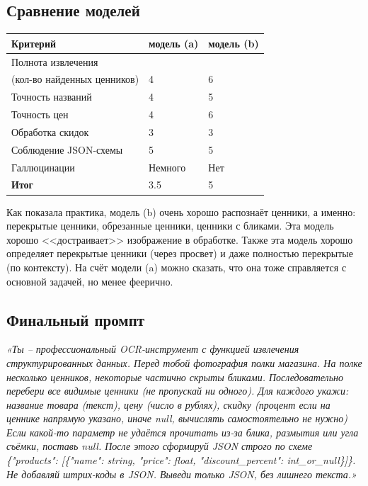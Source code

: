 \subsection{Сравнение моделей}
\begin{table}[h!]
	\centering
	\begin{tabular}{|l|p{5cm}|p{5cm}|}
		\hline
		\textbf{Критерий} & \textbf{модель (a)} & \textbf{модель (b)} \\
		\hline
		Полнота извлечения \\(кол-во найденных ценников) & 4 & 6 \\
		\hline
		Точность названий & 4 & 5 \\
		\hline
		Точность цен & 4 & 6 \\
		\hline
		Обработка скидок  & 3 & 3 \\
		\hline
		Соблюдение JSON-схемы & 5 & 5 \\
		\hline
		Галлюцинации & Немного & Нет \\
		\hline
		\textbf{Итог} & 3.5 & 5\\
		\hline
	\end{tabular}
\end{table}
Как показала практика, модель (b) очень хорошо распознаёт ценники, а именно: перекрытые ценники, обрезанные ценники, ценники с бликами. Эта модель хорошо <<достраивает>> изображение в обработке. Также эта модель хорошо определяет перекрытые ценники (через просвет) и даже полностью перекрытые (по контексту).
На счёт модели (a) можно сказать, что она тоже справляется с основной задачей, но менее феерично.
\subsection{Финальный промпт}
\textit{«Ты – профессиональный OCR-инструмент с функцией извлечения структурированных данных.
Перед тобой фотография полки магазина. На полке несколько ценников, некоторые частично скрыты бликами.
Последовательно перебери все видимые ценники (не пропускай ни одного). Для каждого укажи:
название товара (текст),
цену (число в рублях),
скидку (процент если на ценнике напрямую указано, иначе null, вычислять самостоятельно не нужно)
Если какой-то параметр не удаётся прочитать из‑за блика, размытия или угла съёмки, поставь null.
После этого сформируй JSON строго по схеме \{"products": {[}\{"name": string, "price": float, "discount\_percent": int\_or\_null\}{]}\}.
Не добавляй штрих-коды в JSON.
Выведи только JSON, без лишнего текста.»}
\newpage

